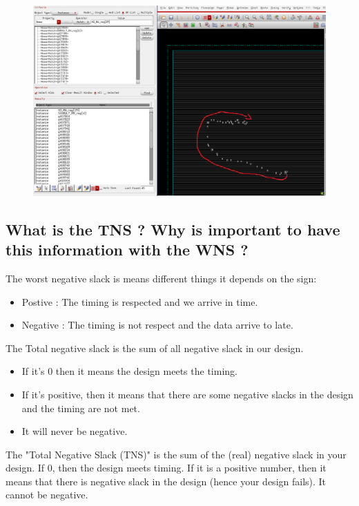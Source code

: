 \documentclass[11pt,a4paper,sans,dvipsnames]{report}
\begin{document}
	\newpage
	\begin{figure}[h!]
		\centering
		\includegraphics[width=\linewidth, frame]{images/pathtiminganalysis.png}
		\label{fig:place_std_cells}
	\end{figure}


	\subsection*{What is the TNS ? Why is important to have this information with the WNS ?}

	The worst negative slack is means different things it depends on the sign:
	\begin{itemize}
		\item Postive : The timing is respected and we arrive in time.
		\item Negative : The timing is not respect and the data arrive to late.
	\end{itemize}

	The Total negative slack is the sum of all negative slack in our design.
	\begin{itemize}
		\item If it's 0 then it means the design meets the timing.
		\item If it's positive, then it means that there are some negative slacks in the design and the timing are not met.
		\item It will never be negative.
	\end{itemize}


	The "Total Negative Slack (TNS)" is the sum of the (real) negative slack in your design. If 0, then the design meets timing. If it is a positive number, then it means that there is negative slack in the design (hence your design fails). It cannot be negative.
\end{document}
